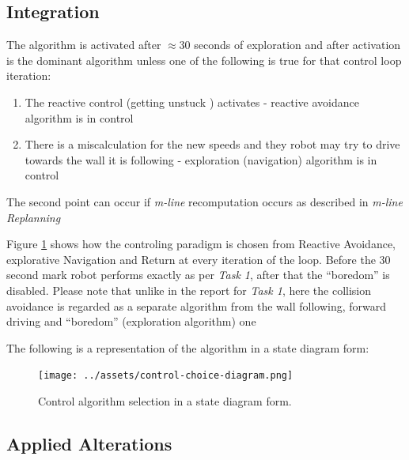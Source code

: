 \documentclass[11pt, a4paper]{article}
\begin{document}

\subsection{Integration}

The algorithm is activated after $\approx 30$ seconds of exploration\cite{task1_report} and after
activation is the dominant algorithm unless one of the following is true for that control loop iteration:

\begin{enumerate}	

	\item The reactive control (getting unstuck \cite{task1_report}) activates - reactive avoidance algorithm is in control
	\item There is a miscalculation for the new speeds and they robot may try to drive towards the wall it is following - exploration (navigation) algorithm is in control

\end{enumerate}

The second point can occur if \textit{m-line} recomputation occurs as described in \textit{m-line Replanning}

Figure \ref{controlflow} shows how the controling paradigm is chosen from Reactive Avoidance, 
explorative Navigation and Return at every iteration of the loop. Before the 30 second mark robot
performs exactly as per \textit{Task 1}, after that the ``boredom''\cite{task1_report} is disabled. 
Please note that unlike in the report for \textit{Task 1}, here the collision avoidance is regarded
as a separate algorithm from the wall following, forward driving and ``boredom'' (exploration algorithm) one

The following is a representation of the algorithm in a state diagram form:
\begin{figure}[H]
  \begin{center}
    \texttt{[image: ../assets/control-choice-diagram.png]}
    \caption{\label{controlflow}Control algorithm selection in a state diagram form.}
  \end{center}
\end{figure} 



\subsection{Applied Alterations}
\label{Needed Alterations}
\end{document}
